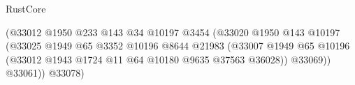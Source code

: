 \begin{lexlean}{RustCore}
\begin{coremodule}
                                                                  (@33012
                                                                    @1950
                                                                    @233
                                                                    @143
                                                                    @34
                                                                    @10197
                                                                    @3454
                                                                    (@33020
                                                                      @1950
                                                                      @143
                                                                      @10197
                                                                      (@33025
                                                                        @1949
                                                                        @65
                                                                        @3352
                                                                        @10196
                                                                        @8644
                                                                        @21983
                                                                        (@33007
                                                                          @1949
                                                                          @65
                                                                          @10196
                                                                          (@33012
                                                                            @1943
                                                                            @1724
                                                                            @11
                                                                            @64
                                                                            @10180
                                                                            @9635
                                                                            @37563
                                                                            @36028))
                                                                        @33069))
                                                                    @33061))
                                                                @33078)

\end{coremodule}
\end{lexlean}

